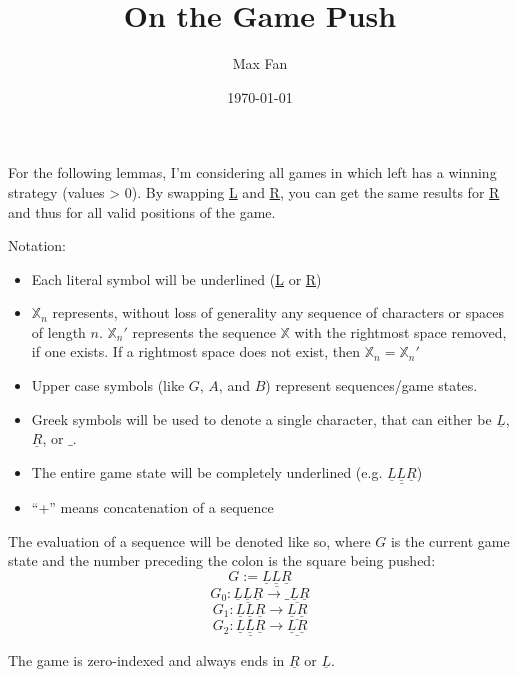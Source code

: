 \documentclass[11pt]{article}
\author{Max Fan}
\date{\today}
\title{On the Game Push}
\begin{document}
\maketitle
For the following lemmas, I'm considering all games in which left has a winning strategy (values > 0).
By swapping \underline{L} and \underline{R}, you can get the same results for \underline{R} and thus for all valid positions of the game.

\bigskip

Notation:

\begin{itemize}
\item Each literal symbol will be underlined (\underline{L} or \underline{R})

\item \(\mathbb{X}_{n}\) represents, without loss of generality any sequence of characters or spaces of length \(n\).
\(\mathbb{X}_{n}'\) represents the sequence \(\mathbb{X}\) with the rightmost space removed, if one exists.
If a rightmost space does not exist, then \(\mathbb{X}_{n}=\mathbb{X}_{n}'\)

\item Upper case symbols (like \(G\), \(A\), and \(B\)) represent sequences/game states.

\item Greek symbols will be used to denote a single character, that can either be \(\underline{L}\), \(\underline{R}\),  or \(\_\).

\item The entire game state will be completely underlined (e.g. \(\underline{\underline{L} \underline{L} \underline{R}}\))

\item ``+'' means concatenation of a sequence
\end{itemize}

The evaluation of a sequence will be denoted like so, where \(G\) is the current game state and the number preceding the colon is the square being pushed:
$$G := \underline{\underline{L} \underline{L} \underline{R}}$$
$$G_{0}: \underline{\underline{L} \underline{L} \underline{R}} \to \underline{\_ \underline{L} \underline{R}}$$
$$G_{1}: \underline{\underline{L} \underline{L} \underline{R}} \to \underline{\underline{L} \underline{R}}$$
$$G_{2}: \underline{\underline{L} \underline{L} \underline{R}} \to \underline{\underline{L} \underline{R}}$$

The game is zero-indexed and always ends in \(\underline{R}\) or \(\underline{L}\).
\end{document}
